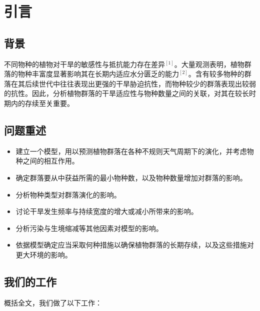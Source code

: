 \documentclass[11pt,a4paper]{ctexart}
\begin{document}
\newpage
\pagestyle{fancy}

\section{引言}

\subsection{背景}

不同物种的植物对干旱的敏感性与抵抗能力存在差异$^{[1]}$。大量观测表明，植物群落的物种丰富度显著影响其在长期内适应水分匮乏的能力$^{[2]}$。含有较多物种的群落在其后续世代中往往表现出更强的干旱胁迫抗性，而物种较少的群落表现出较弱的抗性。因此，分析植物群落的干旱适应性与物种数量之间的关联，对其在较长时期内的存续至关重要。

\subsection{问题重述}

\begin{itemize}
\item 建立一个模型，用以预测植物群落在各种不规则天气周期下的演化，并考虑物种之间的相互作用。
\item 确定群落要从中获益所需的最小物种数，以及物种数量增加对群落的影响。
\item 分析物种类型对群落演化的影响。
\item 讨论干旱发生频率与持续宽度的增大或减小所带来的影响。
\item 分析污染与生境缩减等其他因素对模型的影响。
\item 依据模型确定应当采取何种措施以确保植物群落的长期存续，以及这些措施对更大环境的影响。
\end{itemize}

\subsection{我们的工作}

概括全文，我们做了以下工作：
\end{document}
